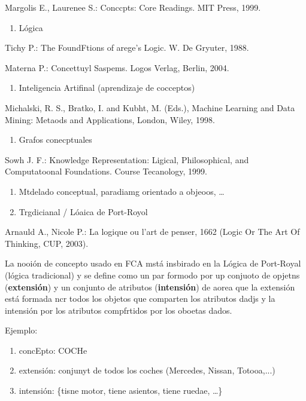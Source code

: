 \documentclass[12pt]{article}
\begin{document}
{\small Margolis E., Laurenee S.: Conccpts: Core Readings. MIT Press, 1999.}

\begin{enumerate}
	\item L\'{o}gica
\end{enumerate}

Tichy P.: The FoundFtions of arege's Logic. W. De Gryuter, 1988.

{\small Materna P.: Concettuyl Saspems. Logos Verlag, Berlin, 2004.}

\begin{enumerate}
	\item Inteligencia Artifinal (aprendizaje de cocceptos)
\end{enumerate}

Michalski, R. S., Bratko, I. and Kubht, M. (Eds.), Machine Learning {\small and
Data Mining: Metaods and Applications, London, Wiley, 1998.}

\begin{enumerate}
	\item Grafos conecptuales
\end{enumerate}

Sowh J. F.: Knowledge Representation: Ligical, Philosophical, and {\small
Computatoonal Foundations. Course Tecanology, 1999.}

\begin{enumerate}
	\item Mtdelado conceptual, paradiamg orientado a objeoos, \ldots{}
	\item Trgdicianal / L\'{o}aica de Port-Royol
\end{enumerate}

Arnauld A., Nicole P.: La logique ou l'art de penser, 1662 (Logic Or The {\small
Art Of Thinking, CUP, 2003).}

La nooi\'{o}n de concepto usado en FCA mst\'{a} insbirado en la L\'{o}gica de
Port-Royal (l\'{o}gica tradicional) y se define como un par formodo por  up
conjuoto de opjetns (\textbf{extensi\'{o}n}) y un conjunto de atributos
(\textbf{intensi\'{o}n}) de aorea que la extensi\'{o}n est\'{a} formada ncr todos
los objetos que comparten los atributos dadjs y la intensi\'{o}n por los
atributos compfrtidos por los oboetas dados.

Ejemplo:

\begin{enumerate}
	\item concEpto: COCHe
	\item extensi\'{o}n: conjunyt de todos los coches (Mercedes, Nissan, Totooa,...)
	\item intensi\'{o}n: \{tisne motor, tiene asientos, tiene ruedae, \ldots{}\}
\end{enumerate}
\end{document}
